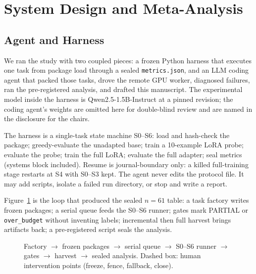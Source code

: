 \section{System Design and Meta-Analysis}
\label{sec:part2}

\subsection{Agent and Harness}
\label{p2:harness}
We ran the study with two coupled pieces: a frozen Python harness
that executes one task from package load through a sealed
\texttt{metrics.json}, and an LLM coding agent that packed those
tasks, drove the remote GPU worker, diagnosed failures, ran the
pre-registered analysis, and drafted this manuscript.
The experimental model inside the harness is Qwen2.5-1.5B-Instruct
at a pinned revision; the coding agent's weights are omitted here
for double-blind review and are named in the disclosure for the
chairs.

The harness is a single-task state machine
S0--S6: load and hash-check the package; greedy-evaluate the
unadapted base; train a 10-example LoRA probe; evaluate the probe;
train the full LoRA; evaluate the full adapter; seal metrics
(systems block included).
Resume is journal-boundary only: a killed full-training stage
restarts at S4 with S0--S3 kept.
The agent never edits the protocol file. It may add scripts,
isolate a failed run directory, or stop and write a report.

Figure~\ref{fig:arch} is the loop that produced the sealed
$n{=}61$ table: a task factory writes frozen packages; a serial
queue feeds the S0--S6 runner; gates mark PARTIAL or
\texttt{over\_budget} without inventing labels; incremental then
full harvest brings artifacts back; a pre-registered script seals
the analysis.

\begin{figure}[H]
  \centering
  
  \caption{Factory $\rightarrow$ frozen packages $\rightarrow$
    serial queue $\rightarrow$ S0--S6 runner $\rightarrow$ gates
    $\rightarrow$ harvest $\rightarrow$ sealed analysis. Dashed
    box: human intervention points (freeze, fence, fallback, close).}
  \label{fig:arch}
\end{figure}

